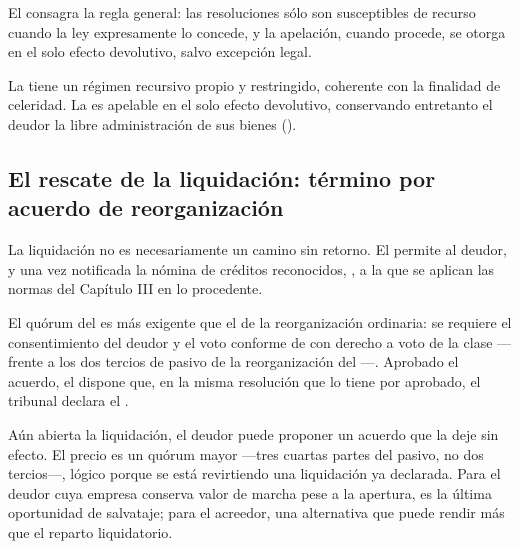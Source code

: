 El  consagra la regla general: las resoluciones sólo son susceptibles de recurso
cuando la ley expresamente lo concede, y la apelación, cuando procede, se otorga en el solo
efecto devolutivo, salvo excepción legal.

La  tiene un régimen recursivo propio y restringido,
coherente con la finalidad de celeridad. La  es apelable en
el solo efecto devolutivo, conservando entretanto el deudor la libre administración de sus
bienes ().

\subsection{El rescate de la liquidación: término por acuerdo de reorganización}

La liquidación no es necesariamente un camino sin retorno. El  permite al deudor,
 y una vez notificada la nómina de créditos
reconocidos, , a la que
se aplican las normas del Capítulo III en lo procedente.

El quórum del  es más exigente que el de la reorganización ordinaria: se requiere el
consentimiento del deudor y el voto conforme de  con derecho a voto de la clase ---
frente a los dos tercios de pasivo de la reorganización del ---. Aprobado el acuerdo, el
 dispone que, en la misma resolución que lo tiene por aprobado, el tribunal declara el
.

\begin{foco}
Aún abierta la liquidación, el deudor puede proponer un acuerdo que la deje sin efecto. El
precio es un quórum mayor ---tres cuartas partes del pasivo, no dos tercios---, lógico porque se
está revirtiendo una liquidación ya declarada. Para el deudor cuya empresa conserva valor de
marcha pese a la apertura, es la última oportunidad de salvataje; para el acreedor, una
alternativa que puede rendir más que el reparto liquidatorio.
\end{foco}

\bloquePractico

